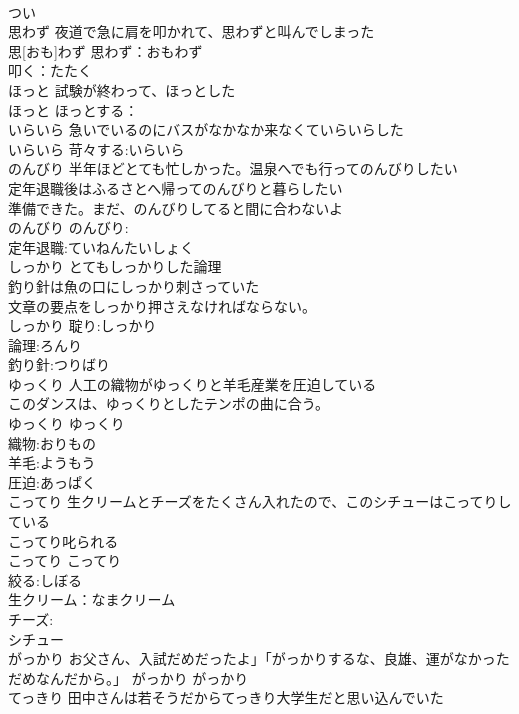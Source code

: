 \documentclass[8pt]{extreport}
\begin{document}
\begin{CJK}{UTF8}{min}
\\	つい						
\\	思わず	夜道で急に肩を叩かれて、思わずと叫んでしまった 
\\	思[おも]わず			思わず：おもわず
\\	叩く：たたく
\\	ほっと	試験が終わって、ほっとした 
\\	ほっと			ほっとする：
\\	いらいら	急いでいるのにバスがなかなか来なくていらいらした 
\\	いらいら			苛々する:いらいら
\\	のんびり	半年ほどとても忙しかった。温泉へでも行ってのんびりしたい 
\\	定年退職後はふるさとへ帰ってのんびりと暮らしたい 
\\	準備できた。まだ、のんびりしてると間に合わないよ 
\\	のんびり			のんびり:
\\	定年退職:ていねんたいしょく
\\	しっかり	とてもしっかりした論理 
\\	釣り針は魚の口にしっかり刺さっていた 
\\	文章の要点をしっかり押さえなければならない。 
\\	しっかり			聢り:しっかり 
\\	論理:ろんり
\\	釣り針:つりばり
\\	ゆっくり	人工の織物がゆっくりと羊毛産業を圧迫している 
\\	このダンスは、ゆっくりとしたテンポの曲に合う。 
\\	ゆっくり			ゆっくり
\\	織物:おりもの
\\	羊毛:ようもう
\\	圧迫:あっぱく
\\	こってり	生クリームとチーズをたくさん入れたので、このシチューはこってりしている 
\\	こってり叱られる 
\\	こってり			こってり
\\	絞る:しぼる
\\	生クリーム：なまクリーム
\\	チーズ:
\\	シチュー
\\	がっかり	お父さん、入試だめだったよ」「がっかりするな、良雄、運がなかっただめなんだから。」	がっかり			がっかり 
\\	てっきり	田中さんは若そうだからてっきり大学生だと思い込んでいた 

\end{CJK}
\end{document}
